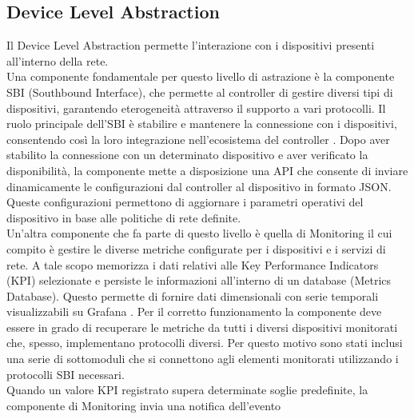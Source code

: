 \subsection{Device Level Abstraction}
Il Device Level Abstraction permette l'interazione con i dispositivi presenti all'interno della rete.
\\Una componente fondamentale per questo livello di astrazione è la componente SBI (Southbound Interface), che permette al controller di gestire diversi tipi di dispositivi, garantendo eterogeneità attraverso il supporto a vari protocolli. 
Il ruolo principale dell'SBI è stabilire e mantenere la connessione con i dispositivi, consentendo così la loro integrazione nell'ecosistema del controller \cite{D32}. 
Dopo aver stabilito la connessione con un determinato dispositivo e aver verificato la disponibilità,
la componente mette a disposizione una API che consente di inviare dinamicamente le configurazioni dal controller al dispositivo in formato JSON.
Queste configurazioni permettono di aggiornare i parametri operativi del dispositivo in base alle politiche di rete definite.
\\Un'altra componente che fa parte di questo livello è quella di Monitoring il cui compito è %
gestire le diverse metriche configurate per i dispositivi e i servizi di rete.
A tale scopo memorizza i dati relativi alle Key Performance Indicators (KPI) selezionate e persiste le informazioni all'interno di un database (Metrics Database).
Questo permette di fornire dati dimensionali con serie temporali visualizzabili su Grafana \cite{grafana}.
Per il corretto funzionamento la componente deve essere in grado di recuperare le metriche da tutti i diversi dispositivi monitorati che,
spesso, implementano protocolli diversi. Per questo motivo sono stati inclusi una serie di sottomoduli che si connettono 
agli elementi monitorati utilizzando i protocolli SBI necessari. %
\\Quando un valore KPI registrato supera determinate soglie predefinite, la componente di Monitoring invia una notifica dell'evento 
